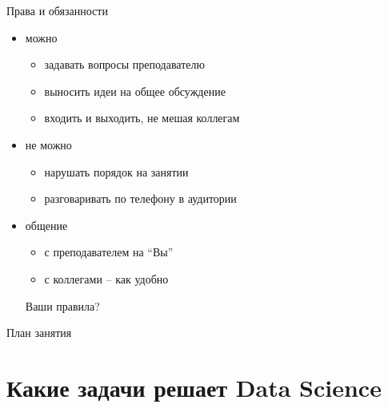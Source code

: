 \documentclass[10pt,a4paper]{beamer}
\begin{document}
\begin{frame}{Права и обязанности}

\begin{itemize}

	\item можно
	\begin{itemize}
		\item задавать вопросы преподавателю
		\item выносить идеи на общее обсуждение
		\item входить и выходить, не мешая коллегам
	\end{itemize}

	\item не можно
	\begin{itemize}
		\item нарушать порядок на занятии
		\item разговаривать по телефону в аудитории	
	\end{itemize}
	
	\item общение
	\begin{itemize}
		\item с преподавателем на ``Вы''
		\item с коллегами -- как удобно
	\end{itemize}
	Ваши правила?

\end{itemize}

\end{frame}


\begin{frame}{План занятия}

\tableofcontents

\end{frame}


\section{Какие задачи решает Data Science}
\end{document}
